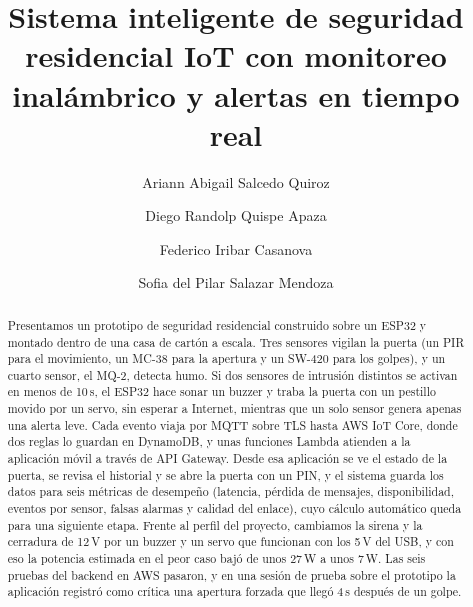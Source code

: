 \documentclass[manuscript,screen,nonacm]{acmart}
\begin{document}
\title[Seguridad residencial IoT]{Sistema inteligente de seguridad residencial IoT con monitoreo inalámbrico y alertas en tiempo real}

\author{Ariann Abigail Salcedo Quiroz}
\author{Diego Randolp Quispe Apaza}
\author{Federico Iribar Casanova}
\author{Sofia del Pilar Salazar Mendoza}
\renewcommand{\shortauthors}{Salcedo, Quispe, Iribar y Salazar}

\begin{abstract}
Presentamos un prototipo de seguridad residencial construido sobre un ESP32 y montado dentro de una casa de cartón a escala. Tres sensores vigilan la puerta (un PIR para el movimiento, un MC-38 para la apertura y un SW-420 para los golpes), y un cuarto sensor, el MQ-2, detecta humo. Si dos sensores de intrusión distintos se activan en menos de 10\,s, el ESP32 hace sonar un buzzer y traba la puerta con un pestillo movido por un servo, sin esperar a Internet, mientras que un solo sensor genera apenas una alerta leve. Cada evento viaja por MQTT sobre TLS hasta AWS IoT Core, donde dos reglas lo guardan en DynamoDB, y unas funciones Lambda atienden a la aplicación móvil a través de API Gateway. Desde esa aplicación se ve el estado de la puerta, se revisa el historial y se abre la puerta con un PIN, y el sistema guarda los datos para seis métricas de desempeño (latencia, pérdida de mensajes, disponibilidad, eventos por sensor, falsas alarmas y calidad del enlace), cuyo cálculo automático queda para una siguiente etapa. Frente al perfil del proyecto, cambiamos la sirena y la cerradura de 12\,V por un buzzer y un servo que funcionan con los 5\,V del USB, y con eso la potencia estimada en el peor caso bajó de unos 27\,W a unos 7\,W. Las seis pruebas del backend en AWS pasaron, y en una sesión de prueba sobre el prototipo la aplicación registró como crítica una apertura forzada que llegó 4\,s después de un golpe.
\end{abstract}


\maketitle
\end{document}

